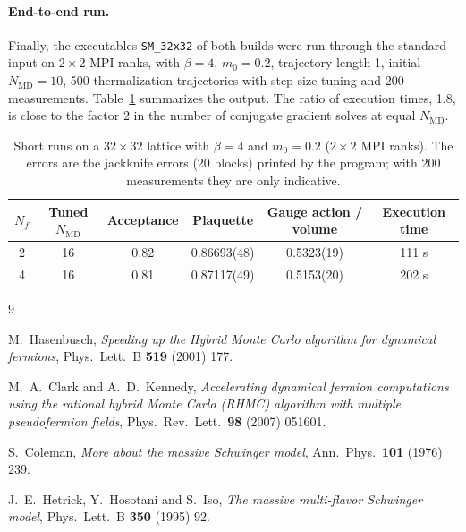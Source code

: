 \documentclass[11pt,a4paper]{article}
\newcommand{\Nf}{N_f}
\newcommand{\NMD}{N_{\mathrm{MD}}}
\newcommand{\code}[1]{\texttt{#1}}
\begin{document}
\paragraph{End-to-end run.}
Finally, the executables \code{SM\_32x32} of both builds were run through the standard input on $2\times2$ MPI ranks,
with $\beta = 4$, $m_0 = 0.2$, trajectory length 1, initial $\NMD = 10$, 500 thermalization trajectories with
step-size tuning and 200 measurements. Table~\ref{tab:run32} summarizes the output. The ratio of execution times,
1.8, is close to the factor 2 in the number of conjugate gradient solves at equal $\NMD$.

\begin{table}[h]
\centering
\small
\begin{tabular}{cccccc}
\toprule
$\Nf$ & Tuned $\NMD$ & Acceptance & Plaquette & Gauge action / volume & Execution time \\
\midrule
2 & 16 & 0.82 & 0.86693(48) & 0.5323(19) & 111 s \\
4 & 16 & 0.81 & 0.87117(49) & 0.5153(20) & 202 s \\
\bottomrule
\end{tabular}
\caption{Short runs on a $32\times32$ lattice with $\beta = 4$ and $m_0 = 0.2$ ($2\times2$ MPI ranks). The errors are the
jackknife errors (20 blocks) printed by the program; with 200 measurements they are only indicative.}
\label{tab:run32}
\end{table}

\begin{thebibliography}{9}

M.~Hasenbusch, \emph{Speeding up the Hybrid Monte Carlo algorithm for dynamical fermions},
Phys.\ Lett.\ B \textbf{519} (2001) 177.

M.~A.~Clark and A.~D.~Kennedy, \emph{Accelerating dynamical fermion computations using the rational hybrid Monte
Carlo (RHMC) algorithm with multiple pseudofermion fields}, Phys.\ Rev.\ Lett.\ \textbf{98} (2007) 051601.

S.~Coleman, \emph{More about the massive Schwinger model}, Ann.\ Phys.\ \textbf{101} (1976) 239.

J.~E.~Hetrick, Y.~Hosotani and S.~Iso, \emph{The massive multi-flavor Schwinger model},
Phys.\ Lett.\ B \textbf{350} (1995) 92.

\end{thebibliography}
\end{document}
